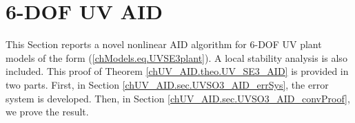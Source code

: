 \section{6-\acs{DOF} \acs{UV} \acs{AID}}
\label{chUV_AID.sec.UV_SE3_AID}

This Section reports a novel nonlinear \ac{AID} algorithm for
6-\ac{DOF} \ac{UV} plant models of the form
(\ref{chModels.eq.UVSE3plant}).
%
A local stability analysis is also included. 
%
This proof of Theorem \ref{chUV_AID.theo.UV_SE3_AID} is provided in
two parts.
%
First, in Section \ref{chUV_AID.sec.UVSO3_AID_errSys}, the error system
is developed.
%
Then, in Section \ref{chUV_AID.sec.UVSO3_AID_convProof}, we prove the result.  



